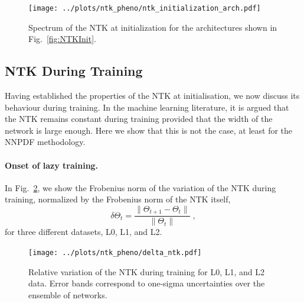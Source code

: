 \begin{figure}[ht!]
  \centering

  \texttt{[image: ../plots/ntk\_pheno/ntk\_initialization\_arch.pdf]}
  \caption{Spectrum of the NTK at initialization for the architectures shown in
  Fig.~\ref{fig:NTKInit}. }
  \label{fig:NTKSpectrum}
\end{figure}

\subsection{NTK During Training}
Having established the properties of the NTK at initialisation, we now discuss
its behaviour during training. In the machine learning literature, it is argued
that the NTK remains constant during training provided that the width of the
network is large enough. Here we show that this is not the case, at least for
the NNPDF methodology. 

\paragraph{Onset of lazy training.} In Fig.~\ref{fig:NTKTime}, we show the Frobenius norm of the variation
of the NTK during training, normalized by the Frobenius norm of the NTK itself, 
\begin{equation}
\delta \Theta_t = \frac{\lVert \Theta_{t+1} - \Theta_t \rVert}{\lVert \Theta_t \rVert} \;,
\label{eq:DeltaNTK}
\end{equation}
for three different datasets, L0, L1, and L2. 

\begin{figure}[ht!]
  \centering
  \texttt{[image: ../plots/ntk\_pheno/delta\_ntk.pdf]}
  \caption{Relative variation of the NTK during training for L0, L1, and L2
  data. Error bands correspond to one-sigma uncertainties over the ensemble of
  networks.}
  \label{fig:NTKTime}
\end{figure}

